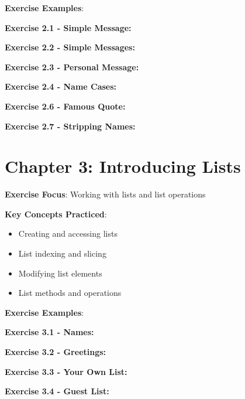 \textbf{Exercise Examples}:

\textbf{Exercise 2.1 - Simple Message:}


\textbf{Exercise 2.2 - Simple Messages:}


\textbf{Exercise 2.3 - Personal Message:}


\textbf{Exercise 2.4 - Name Cases:}


\textbf{Exercise 2.6 - Famous Quote:}


\textbf{Exercise 2.7 - Stripping Names:}


\section*{Chapter 3: Introducing Lists}
\textbf{Exercise Focus}: Working with lists and list operations

\textbf{Key Concepts Practiced}:
\begin{itemize}
    \item Creating and accessing lists
    \item List indexing and slicing
    \item Modifying list elements
    \item List methods and operations
\end{itemize}

\textbf{Exercise Examples}:

\textbf{Exercise 3.1 - Names:}


\textbf{Exercise 3.2 - Greetings:}


\textbf{Exercise 3.3 - Your Own List:}


\textbf{Exercise 3.4 - Guest List:}


